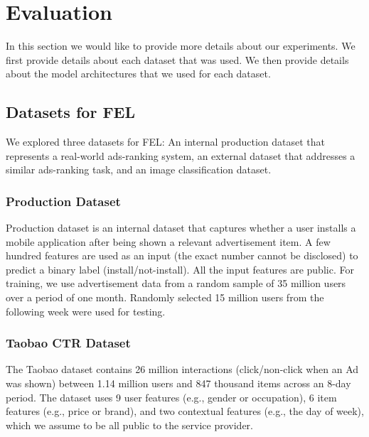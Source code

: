 \documentclass{article}
\begin{document}





\section{Evaluation}
In this section we would like to provide more details about our experiments. We first provide details about each dataset that was used. We then provide details about the model architectures that we used for each dataset.
\subsection{Datasets for FEL}
\label{sec:datasets}
We explored three datasets for FEL: An internal production dataset that represents a real-world ads-ranking system, an external dataset that addresses a similar ads-ranking task, and an image classification dataset.

\subsubsection{Production Dataset}
Production dataset is an internal dataset that captures whether a user installs a mobile application after being shown a relevant advertisement item. A few hundred features are used as an input (the exact number cannot be disclosed) to predict a binary label (install/not-install). All the input features are public. For training, we use advertisement data from a random sample of 35 million users over a period of one month. Randomly selected 15 million users from the following week were used for testing.


\subsubsection{Taobao CTR Dataset}
The Taobao dataset contains 26 million interactions (click/non-click when an Ad was shown) between 1.14 million users and 847 thousand items across an 8-day period.
The dataset uses 9 user features (e.g., gender or occupation), 6 item features (e.g., price or brand), and two contextual features (e.g., the day of week), which we assume to be all public to the service provider.
\end{document}
